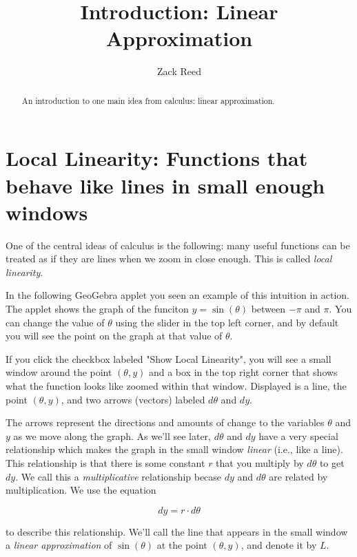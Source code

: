 \documentclass{ximera}
\title{Introduction: Linear Approximation}
\author{Zack Reed}
\begin{document}
\begin{abstract}
    An introduction to one main idea from calculus: linear approximation.
\end{abstract}
\maketitle

\section{Local Linearity: Functions that behave like lines in small enough windows}

One of the central ideas of calculus is the following: many useful functions can be treated as if they are lines when we zoom in close enough. This is called \textit{local linearity}.

In the following GeoGebra applet you seen an example of this intuition in action. The applet shows the graph of the funciton $y=\sin(\theta)$ between $-\pi$ and $\pi$. You can change the value of $\theta$ using the slider in the top left corner, and by default you will see the point on the graph at that value of $\theta$.

If you click the checkbox labeled "Show Local Linearity", you will see a small window around the point $(\theta, y)$ and a box in the top right corner that shows what the function looks like zoomed within that window. Displayed is a line, the point $(\theta, y)$, and two arrows (vectors) labeled $d\theta$ and $dy$. 


The arrows represent the directions and amounts of change to the variables $\theta$ and $y$ as we move along the graph. As we'll see later, $d\theta$ and $dy$ have a very special relationship which makes the graph in the small window \emph{linear} (i.e., like a line). This relationship is that there is some constant $r$ that you multiply by $d\theta$ to get $dy$. We call this a \emph{multiplicative} relationship becase $dy$ and $d\theta$ are related by multiplication. We use the equation 

$$dy = r \cdot d\theta$$

to describe this relationship. We'll call the line that appears in the small window a \emph{linear approximation} of $\sin(\theta)$ at the point $(\theta,y)$, and denote it by $L$. 
\end{document}
